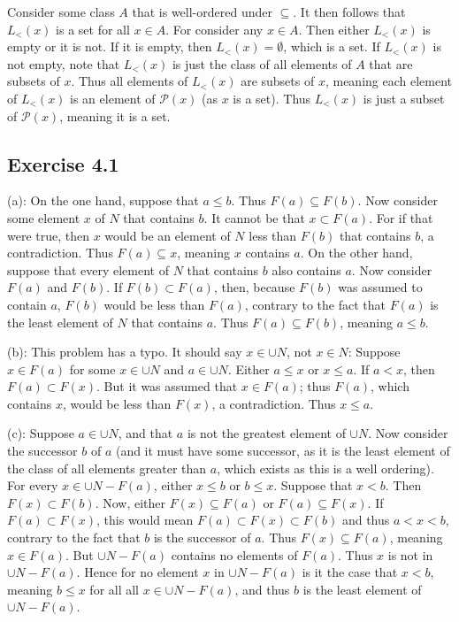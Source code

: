 \documentclass{article}
\theoremstyle{definition}
\begin{document}
Consider some class $A$ that is well-ordered under $\subseteq$. It then follows that $L_<(x)$ is a set for all $x\in A$. For consider 
any $x\in A$. Then either $L_<(x)$ is empty or it is not. If it is empty, then $L_<(x)=\emptyset$, which is a set. If 
$L_<(x)$ is not empty, note that $L_<(x)$ is just the class of all elements of $A$ that are subsets of $x$. Thus all elements 
of $L_<(x)$ are subsets of $x$, meaning each element of $L_<(x)$ is an element of $\mathcal{P}(x)$ (as $x$ is a set). 
Thus $L_<(x)$ is just a subset of $\mathcal{P}(x)$, meaning it is a set. 

\subsection*{Exercise 4.1}
(a): On the one hand, suppose that $a\le b$. Thus $F(a)\subseteq F(b)$. Now consider some element $x$ of $N$ that contains $b$. It cannot be that 
$x\subset F(a)$. For if that were true, then $x$ would be an element of $N$ less than $F(b)$ that contains $b$, a contradiction. 
Thus $F(a)\subseteq x$, meaning $x$ contains $a$. On the other hand, 
suppose that every element of $N$ that contains $b$ also contains $a$. Now consider $F(a)$ and $F(b)$. If $F(b)\subset F(a)$, then, because $F(b)$ was assumed 
to contain $a$, $F(b)$ would be less than $F(a)$, contrary to the fact that $F(a)$ is the least element of $N$ that contains $a$. Thus 
$F(a)\subseteq F(b)$, meaning $a\le b$.

(b): This problem has a typo. It should say $x\in\cup N$, not $x\in N$: Suppose $x\in F(a)$ for some $x\in\cup N$ and $a\in\cup N$. Either 
$a\le x$ or $x\le a$. If $a<x$, then $F(a)\subset F(x)$. But it was assumed that $x\in F(a)$; thus $F(a)$, which contains $x$,
would be less than $F(x)$, a contradiction. Thus $x\le a$.

(c): Suppose $a\in\cup N$, and that $a$ is not the greatest element of $\cup N$. Now consider the successor $b$ of $a$ (and it must have some successor, as 
it is the least element of the class of all elements greater than $a$, which exists as this is a well ordering). For every $x\in \cup N-F(a)$, either 
$x\le b$ or $b\le x$. Suppose that $x<b$. Then $F(x)\subset F(b)$. 
Now, 
either $F(x)\subseteq F(a)$ or $F(a)\subseteq F(x)$. If $F(a)\subset F(x)$, this would mean $F(a)\subset F(x)\subset F(b)$ and thus 
$a<x<b$, contrary to the fact 
that $b$ is the successor of $a$. Thus $F(x)\subseteq F(a)$, meaning $x\in F(a)$. But $\cup N-F(a)$ contains no elements of $F(a)$. Thus $x$ 
is not in $\cup N-F(a)$. Hence for no element $x$ in $\cup N-F(a)$ is it the case that $x<b$, meaning $b\le x$ for 
all all $x\in \cup N-F(a)$, and thus $b$ is the least element of $\cup N-F(a)$.
\end{document}
